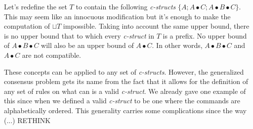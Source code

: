 Let's redefine the set $T$ to contain the following \textit{c-structs} $\{A ; A \bullet C ; A \bullet B \bullet C\}$. This may seem like an innocuous modification but it's enough to make the computation of $\sqcup T$ impossible. Taking into account the same upper bound, there is no upper bound that to which every \textit{c-struct} in $T$ is a prefix. No upper bound of $A \bullet B \bullet C$ will also be an upper bound of $A \bullet C$. In other words, $A \bullet B \bullet C$ and $A \bullet C$ are not compatible.\par 
These concepts can be applied to any set of \textit{c-structs}. However, the generalized consensus problem gets its name from the fact that it allows for the definition of any set of rules on what can is a valid \textit{c-struct}. We already gave one example of this since when we defined a valid \textit{c-struct} to be one where the commands are alphabetically ordered. {\color{red} This generality carries some complications since the way (...) RETHINK}

